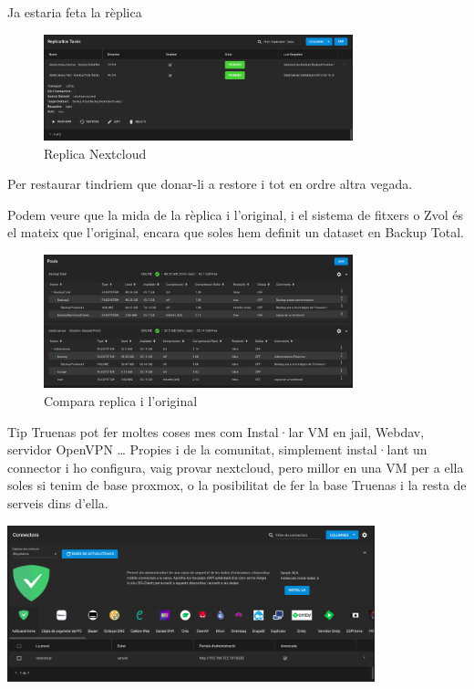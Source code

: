 \documentclass[
  10pt,
]{krantz}
\begin{document}
Ja estaria feta la rèplica

\begin{figure}
\centering
\includegraphics[width=0.8\textwidth,height=\textheight]{imatges/proxmox/replica3.png}
\caption{Replica Nextcloud}
\end{figure}

Per restaurar tindriem que donar-li a restore i tot en ordre altra vegada.

Podem veure que la mida de la rèplica i l'original, i el sistema de fitxers o Zvol és el mateix que l'original, encara que soles hem definit un dataset en Backup Total.

\begin{figure}
\centering
\includegraphics[width=0.8\textwidth,height=\textheight]{imatges/proxmox/Tamany_replica.png}
\caption{Compara replica i l'original}
\end{figure}

\begin{rmdtip}{Tip}
Truenas pot fer moltes coses mes com Instal·lar VM en jail, Webdav, servidor OpenVPN \ldots{} Propies i de la comunitat, simplement instal·lant un connector i ho configura, vaig provar nextcloud, pero millor en una VM per a ella soles si tenim de base proxmox, o la posibilitat de fer la base Truenas i la resta de serveis dins d'ella.

\includegraphics[width=0.8\textwidth,height=\textheight]{imatges/proxmox/connectors_truenas.png}

\end{rmdtip}
\end{document}
